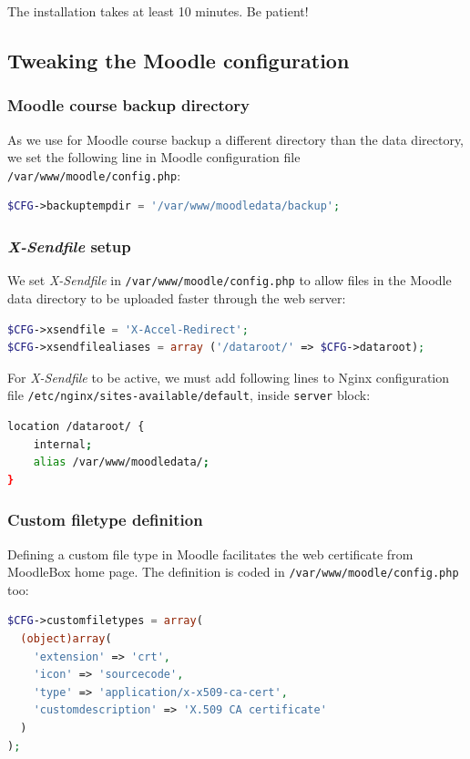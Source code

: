\documentclass[12pt]{article}
\begin{document}
The installation takes at least 10 minutes.
Be patient!

\subsection{Tweaking the Moodle configuration}

\subsubsection{Moodle course backup directory}

As we use for Moodle course backup a different directory than the data directory, we set the following line in Moodle configuration file \lstinline{/var/www/moodle/config.php}:
\begin{lstlisting}[language=php]
$CFG->backuptempdir = '/var/www/moodledata/backup';
\end{lstlisting}

\subsubsection{\emph{X-Sendfile} setup}

We set \emph{X-Sendfile} in \lstinline{/var/www/moodle/config.php} to allow files in the Moodle data directory to be uploaded faster through the web server:
\begin{lstlisting}[language=php]
$CFG->xsendfile = 'X-Accel-Redirect';
$CFG->xsendfilealiases = array ('/dataroot/' => $CFG->dataroot);
\end{lstlisting}
For \emph{X-Sendfile} to be active, we must add following lines to Nginx configuration file \lstinline{/etc/nginx/sites-available/default}, inside \lstinline{server} block:
\begin{lstlisting}[language=bash]
location /dataroot/ {
    internal;
    alias /var/www/moodledata/;
}
\end{lstlisting}

\subsubsection{Custom filetype definition}

Defining a custom file type in Moodle facilitates the web certificate from MoodleBox home page. The definition is coded in \lstinline{/var/www/moodle/config.php} too:
\begin{lstlisting}[language=php]
$CFG->customfiletypes = array(
  (object)array(
    'extension' => 'crt',
    'icon' => 'sourcecode',
    'type' => 'application/x-x509-ca-cert',
    'customdescription' => 'X.509 CA certificate'
  )
);
\end{lstlisting}
\end{document}
